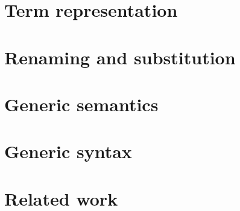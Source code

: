 \section{Term representation}\label{sec:terms}

\section{Renaming and substitution}\label{sec:kits}

\section{Generic semantics}\label{sec:gen-sem}

\section{Generic syntax}\label{sec:gen-syn}

%
\section{Related work}\label{sec:mech-related}

